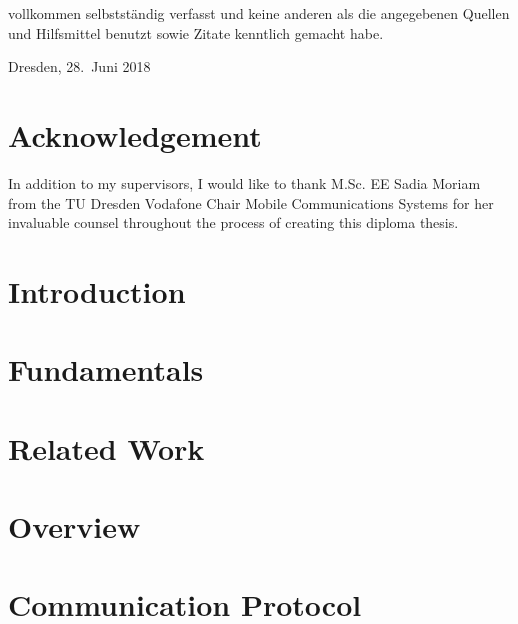 \documentclass[
	paper=a4,
	open=right, %
	twoside=true,
	fontsize=11pt,
	parskip=full %
]{scrreprt}
\begin{document}
    vollkommen selbstständig verfasst und keine anderen als die angegebenen Quellen und Hilfsmittel benutzt sowie Zitate kenntlich gemacht habe.

    \vspace{0.5\baselineskip}
    Dresden, 28.\ Juni 2018 \\

    \vspace{1.5\baselineskip}
    \theauthor

	\chapter*{Acknowledgement}
    In addition to my supervisors, I would like to thank M.Sc. EE Sadia Moriam from the TU Dresden Vodafone Chair Mobile Communications Systems for
    her invaluable counsel throughout the process of creating this diploma thesis.
	
	\tableofcontents
	
	
	\listoftables
	\vspace{-2.6\baselineskip}
	\begingroup
	\let\clearpage\relax
	\listoffigures
	\endgroup
	
	
	\chapter{Introduction}\label{ch:introduction}
    
    
    \chapter{Fundamentals}\label{ch:fundamentals}
    

    \chapter{Related Work}\label{ch:relatedwork}
    

    \chapter{Overview}\label{ch:overview}
    

    \chapter{Communication Protocol}\label{ch:protocol}
    
\end{document}
